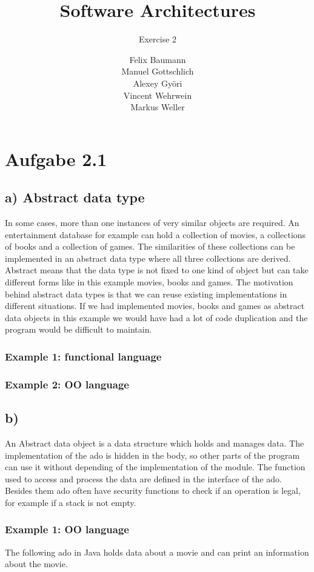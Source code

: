 \documentclass[a4paper,10pt]{scrartcl}[2003/01/01]
\title{Software Architectures}
\subtitle{Exercise 2}
\author{ Felix Baumann \\ Manuel Gottschlich \\  Alexey Gy\"ori \\ Vincent Wehrwein \\ Markus Weller}
\begin{document}
\maketitle

\section*{Aufgabe 2.1}
\subsection*{a) Abstract data type}
In some cases, more than one instances of very similar objects are required. An  entertainment database for example can hold a collection of movies, a collections of books and a collection of games. The similarities of these collections can be implemented in an abstract data type where all three collections are derived. Abstract means that the data type is not fixed to one kind of object but can take different forms like in this example movies, books and games. The motivation behind abstract data types is that we can reuse existing implementations in different situations. If we had implemented movies, books and games as abstract data objects in this example we would have had a lot of code duplication and the program would be difficult to maintain.

\subsubsection*{Example 1: functional language}


\subsubsection*{Example 2: OO language}



\subsection*{b)}
An Abstract data object is a data structure which holds and manages data. The implementation of the ado is hidden in the body, so other parts of the program can use it without depending of the implementation of the module. The function used to access and process the data are defined in the interface of the ado. Besides them ado often have security functions to check if an operation is legal, for example if a stack is not empty. 

\subsubsection*{Example 1: OO language}
The following ado in Java holds data about a movie and can print an information about the movie. 

\end{document}
